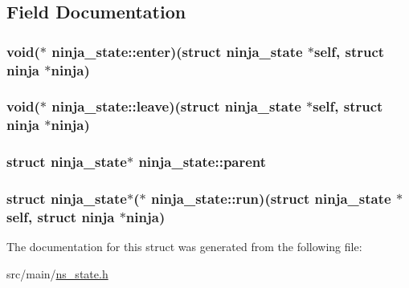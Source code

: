 \subsection{Field Documentation}
\hypertarget{structninja__state_aac109f61704e26f5116501e390a2183f}{
\subsubsection[{enter}]{\setlength{\rightskip}{0pt plus 5cm}void($\ast$ ninja\+\_\+state\+::enter)(struct {\bf ninja\+\_\+state} $\ast$self, struct {\bf ninja} $\ast${\bf ninja})}}\label{structninja__state_aac109f61704e26f5116501e390a2183f}
\hypertarget{structninja__state_ac95b7def4cb35156771cafdece50668f}{
\subsubsection[{leave}]{\setlength{\rightskip}{0pt plus 5cm}void($\ast$ ninja\+\_\+state\+::leave)(struct {\bf ninja\+\_\+state} $\ast$self, struct {\bf ninja} $\ast${\bf ninja})}}\label{structninja__state_ac95b7def4cb35156771cafdece50668f}
\hypertarget{structninja__state_a291d892af65699495e91f52b10c9c28c}{
\subsubsection[{parent}]{\setlength{\rightskip}{0pt plus 5cm}struct {\bf ninja\+\_\+state}$\ast$ ninja\+\_\+state\+::parent}}\label{structninja__state_a291d892af65699495e91f52b10c9c28c}
\hypertarget{structninja__state_a7cbd1ccaddd06c7efb10c197040524f3}{
\subsubsection[{run}]{\setlength{\rightskip}{0pt plus 5cm}struct {\bf ninja\+\_\+state}$\ast$($\ast$ ninja\+\_\+state\+::run)(struct {\bf ninja\+\_\+state} $\ast$self, struct {\bf ninja} $\ast${\bf ninja})}}\label{structninja__state_a7cbd1ccaddd06c7efb10c197040524f3}


The documentation for this struct was generated from the following file\+:\begin{DoxyCompactItemize}
\item 
src/main/\hyperlink{ns__state_8h}{ns\+\_\+state.\+h}\end{DoxyCompactItemize}
